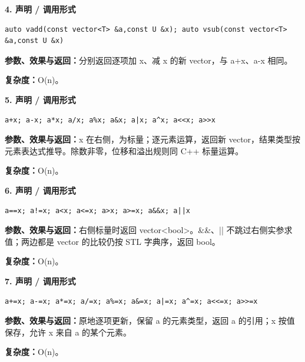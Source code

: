 \documentclass[UTF8,a4paper,10pt]{ctexart}
\begin{document}
\noindent\begin{minipage}{\textwidth}
\textbf{4. 声明 / 调用形式}
\begin{lstlisting}
auto vadd(const vector<T> &a,const U &x); auto vsub(const vector<T> &a,const U &x)
\end{lstlisting}
\textbf{参数、效果与返回：}分别返回逐项加 x、减 x 的新 vector，与 a+x、a-x 相同。

\textbf{复杂度：}O(n)。

\end{minipage}\par\vspace{0.4em}
\noindent\begin{minipage}{\textwidth}
\textbf{5. 声明 / 调用形式}
\begin{lstlisting}
a+x; a-x; a*x; a/x; a%x; a&x; a|x; a^x; a<<x; a>>x
\end{lstlisting}
\textbf{参数、效果与返回：}x 在右侧，为标量；逐元素运算，返回新 vector，结果类型按元素表达式推导。除数非零，位移和溢出规则同 C++ 标量运算。

\textbf{复杂度：}O(n)。

\end{minipage}\par\vspace{0.4em}
\noindent\begin{minipage}{\textwidth}
\textbf{6. 声明 / 调用形式}
\begin{lstlisting}
a==x; a!=x; a<x; a<=x; a>x; a>=x; a&&x; a||x
\end{lstlisting}
\textbf{参数、效果与返回：}右侧标量时返回 vector<bool>。\&\&、|| 不跳过右侧实参求值；两边都是 vector 的比较仍按 STL 字典序，返回 bool。

\textbf{复杂度：}O(n)。

\end{minipage}\par\vspace{0.4em}
\noindent\begin{minipage}{\textwidth}
\textbf{7. 声明 / 调用形式}
\begin{lstlisting}
a+=x; a-=x; a*=x; a/=x; a%=x; a&=x; a|=x; a^=x; a<<=x; a>>=x
\end{lstlisting}
\textbf{参数、效果与返回：}原地逐项更新，保留 a 的元素类型，返回 a 的引用；x 按值保存，允许 x 来自 a 的某个元素。

\textbf{复杂度：}O(n)。

\end{minipage}\par\vspace{0.4em}
\end{document}
